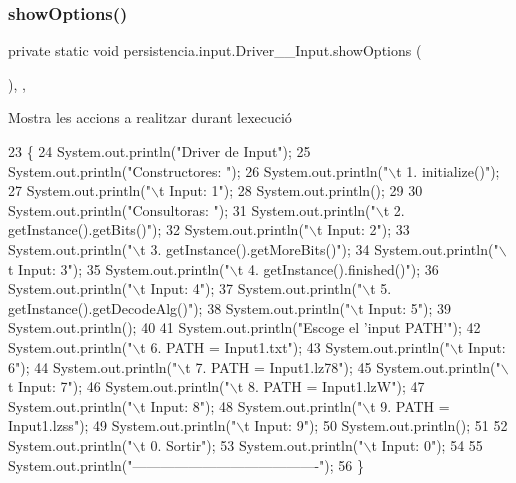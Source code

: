 \subsubsection{\texorpdfstring{show\+Options()}{showOptions()}}
{\footnotesize\ttfamily private static void persistencia.\+input.\+Driver\+\_\+\+\_\+\+Input.\+show\+Options (\begin{DoxyParamCaption}{ }\end{DoxyParamCaption})\hspace{0.3cm}{\ttfamily [inline]}, {\ttfamily [static]}, {\ttfamily [private]}}



Mostra les accions a realitzar durant l\textquotesingle{}execució 


\begin{DoxyCode}
23                                      \{
24         System.out.println(\textcolor{stringliteral}{"Driver de Input"});
25         System.out.println(\textcolor{stringliteral}{"Constructores: "});
26         System.out.println(\textcolor{stringliteral}{"\(\backslash\)t 1. initialize()"});
27         System.out.println(\textcolor{stringliteral}{"\(\backslash\)t Input: 1"});
28         System.out.println();
29 
30         System.out.println(\textcolor{stringliteral}{"Consultoras: "});
31         System.out.println(\textcolor{stringliteral}{"\(\backslash\)t 2. getInstance().getBits()"});
32         System.out.println(\textcolor{stringliteral}{"\(\backslash\)t Input: 2"});
33         System.out.println(\textcolor{stringliteral}{"\(\backslash\)t 3. getInstance().getMoreBits()"});
34         System.out.println(\textcolor{stringliteral}{"\(\backslash\)t Input: 3"});
35         System.out.println(\textcolor{stringliteral}{"\(\backslash\)t 4. getInstance().finished()"});
36         System.out.println(\textcolor{stringliteral}{"\(\backslash\)t Input: 4"});
37         System.out.println(\textcolor{stringliteral}{"\(\backslash\)t 5. getInstance().getDecodeAlg()"});
38         System.out.println(\textcolor{stringliteral}{"\(\backslash\)t Input: 5"});
39         System.out.println();
40 
41         System.out.println(\textcolor{stringliteral}{"Escoge el 'input PATH'"});
42         System.out.println(\textcolor{stringliteral}{"\(\backslash\)t 6. PATH = Input1.txt"});
43         System.out.println(\textcolor{stringliteral}{"\(\backslash\)t Input: 6"});
44         System.out.println(\textcolor{stringliteral}{"\(\backslash\)t 7. PATH = Input1.lz78"});
45         System.out.println(\textcolor{stringliteral}{"\(\backslash\)t Input: 7"});
46         System.out.println(\textcolor{stringliteral}{"\(\backslash\)t 8. PATH = Input1.lzW"});
47         System.out.println(\textcolor{stringliteral}{"\(\backslash\)t Input: 8"});
48         System.out.println(\textcolor{stringliteral}{"\(\backslash\)t 9. PATH = Input1.lzss"});
49         System.out.println(\textcolor{stringliteral}{"\(\backslash\)t Input: 9"});
50         System.out.println();
51 
52         System.out.println(\textcolor{stringliteral}{"\(\backslash\)t 0. Sortir"});
53         System.out.println(\textcolor{stringliteral}{"\(\backslash\)t Input: 0"});
54 
55         System.out.println(\textcolor{stringliteral}{"----------------------------------------"});
56     \}
\end{DoxyCode}


